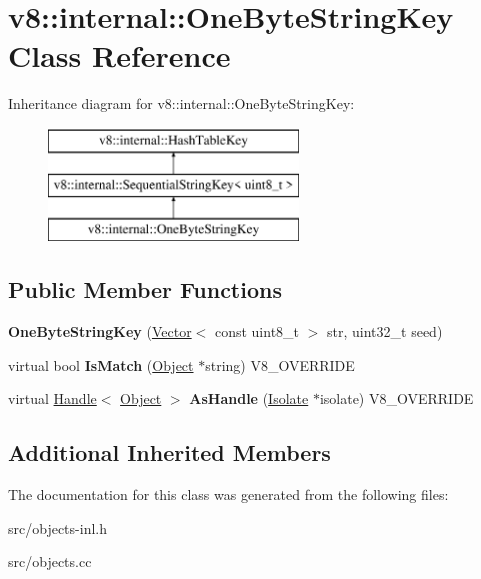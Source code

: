 \hypertarget{classv8_1_1internal_1_1_one_byte_string_key}{}\section{v8\+:\+:internal\+:\+:One\+Byte\+String\+Key Class Reference}
\label{classv8_1_1internal_1_1_one_byte_string_key}
Inheritance diagram for v8\+:\+:internal\+:\+:One\+Byte\+String\+Key\+:\begin{figure}[H]
\begin{center}
\leavevmode
\includegraphics[height=3.000000cm]{classv8_1_1internal_1_1_one_byte_string_key}
\end{center}
\end{figure}
\subsection*{Public Member Functions}
\begin{DoxyCompactItemize}
\item 
\hypertarget{classv8_1_1internal_1_1_one_byte_string_key_af497a4add2f39394c97aa60b9d98c1be}{}{\bfseries One\+Byte\+String\+Key} (\hyperlink{classv8_1_1internal_1_1_vector}{Vector}$<$ const uint8\+\_\+t $>$ str, uint32\+\_\+t seed)\label{classv8_1_1internal_1_1_one_byte_string_key_af497a4add2f39394c97aa60b9d98c1be}

\item 
\hypertarget{classv8_1_1internal_1_1_one_byte_string_key_aadde5bb8542d8e4543a779a7f308e244}{}virtual bool {\bfseries Is\+Match} (\hyperlink{classv8_1_1internal_1_1_object}{Object} $\ast$string) V8\+\_\+\+O\+V\+E\+R\+R\+I\+D\+E\label{classv8_1_1internal_1_1_one_byte_string_key_aadde5bb8542d8e4543a779a7f308e244}

\item 
\hypertarget{classv8_1_1internal_1_1_one_byte_string_key_a3b2b7f201a75a3e4d807af1f0f091be3}{}virtual \hyperlink{classv8_1_1internal_1_1_handle}{Handle}$<$ \hyperlink{classv8_1_1internal_1_1_object}{Object} $>$ {\bfseries As\+Handle} (\hyperlink{classv8_1_1internal_1_1_isolate}{Isolate} $\ast$isolate) V8\+\_\+\+O\+V\+E\+R\+R\+I\+D\+E\label{classv8_1_1internal_1_1_one_byte_string_key_a3b2b7f201a75a3e4d807af1f0f091be3}

\end{DoxyCompactItemize}
\subsection*{Additional Inherited Members}


The documentation for this class was generated from the following files\+:\begin{DoxyCompactItemize}
\item 
src/objects-\/inl.\+h\item 
src/objects.\+cc\end{DoxyCompactItemize}
